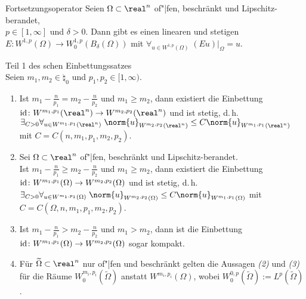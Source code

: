 \begin{Lemma}{Fortsetzungsoperator}
    Seien $\Omega \subset \real^n$ of"|fen, beschränkt und Lipschitz-berandet,\\
    $p \in [1, \infty]$ und $\delta > 0$.
    Dann gibt es einen linearen und stetigen \\
    $E\colon W^{1,p}(\Omega) \to W_0^{1,p}(B_\delta(\Omega))$ mit
    $\forall_{u \in W^{1,p}(\Omega)}\; (Eu)|_\Omega = u$.
\end{Lemma}

\begin{Satz}{Teil 1 des schen Einbettungssatzes}\\
    Seien $m_1, m_2 \in \natural_0$ und $p_1, p_2 \in [1, \infty)$.
    \begin{enumerate}
        \item
        Ist $m_1 - \frac{n}{p_1} = m_2 - \frac{n}{p_2}$ und $m_1 \ge m_2$, dann existiert die
        Einbettung\\
        $\id\colon W^{m_1,p_1}(\real^n) \to W^{m_2,p_2}(\real^n)$ und ist stetig, d.\,h.\\
        $\exists_{C > 0} \forall_{u \in W^{m_1,p_1}(\real^n)}\;
        \norm{u}_{W^{m_2,p_2}(\real^n)} \le C \norm{u}_{W^{m_1,p_1}(\real^n)}$ mit
        $C = C(n, m_1, p_1, m_2, p_2)$.

        \item
        Sei $\Omega \subset \real^n$ of"|fen, beschränkt und Lipschitz-berandet.\\
        Ist $m_1 - \frac{n}{p_1} \ge m_2 - \frac{n}{p_2}$ und $m_1 \ge m_2$, dann existiert die
        Einbettung\\
        $\text{id}\colon W^{m_1,p_1}(\Omega) \to W^{m_2,p_2}(\Omega)$ und ist stetig, d.\,h.\\
        $\exists_{C > 0} \forall_{u \in W^{m_1,p_1}(\Omega)}\;
        \norm{u}_{W^{m_2,p_2}(\Omega)} \le C \norm{u}_{W^{m_1,p_1}(\Omega)}$ mit
        $C = C(\Omega, n, m_1, p_1, m_2, p_2)$.

        \item
        Ist $m_1 - \frac{n}{p_1} > m_2 - \frac{n}{p_2}$ und $m_1 > m_2$, dann ist die Einbettung
        $\text{id}\colon W^{m_1,p_1}(\Omega) \to W^{m_2,p_2}(\Omega)$ sogar kompakt.

        \item
        Für $\widetilde{\Omega} \subset \real^n$ nur of"|fen und beschränkt gelten die Aussagen
        \emph{(2)} und \emph{(3)} für die Räume $W^{m_i,p_i}_0(\widetilde{\Omega})$ anstatt
        $W^{m_i,p_i}(\Omega)$, wobei $W^{0,p}_0(\widetilde{\Omega}) := L^p(\widetilde{\Omega})$.
    \end{enumerate}
\end{Satz}

